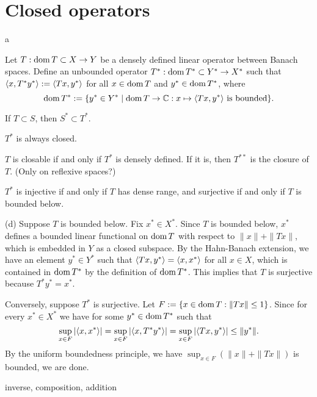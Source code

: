 \documentclass{../../large}
\begin{document}
\section{Closed operators}

\begin{prb}
\begin{parts}
\item a
\end{parts}
\end{prb}

\begin{prb}
Let $T:\operatorname{dom} T\subset X\to Y$ be a densely defined linear operator between Banach spaces.
Define an unbounded operator $T^*:\operatorname{dom} T^*\subset Y^*\to X^*$ such that $\langle x,T^*y^*\rangle:=\langle Tx,y^*\rangle$ for all $x\in\operatorname{dom} T$ and $y^*\in\operatorname{dom} T^*$, where
\[\operatorname{dom} T^*:=\{y^*\in Y^*\mid \operatorname{dom} T\to\mathbb{C}:x\mapsto\langle Tx,y^*\rangle\text{ is bounded}\}.\]
\begin{parts}
\item If $T\subset S$, then $S^*\subset T^*$.
\item $T^*$ is always closed.
\item $T$ is closable if and only if $T^*$ is densely defined. If it is, then $T^{**}$ is the closure of $T$. (Only on reflexive spaces?)
\item $T^*$ is injective if and only if $T$ has dense range, and surjective if and only if $T$ is bounded below.
\end{parts}
\end{prb}
\begin{pf}

(d)
Suppose $T$ is bounded below.
Fix $x^*\in X^*$.
Since $T$ is bounded below, $x^*$ defines a bounded linear functional on $\operatorname{dom} T$ with respect to $\|x\|+\|Tx\|$, which is embedded in $Y$ as a closed subspace.
By the Hahn-Banach extension, we have an element $y^*\in Y^*$ such that $\langle Tx,y^*\rangle=\langle x,x^*\rangle$ for all $x\in X$, which is contained in $\operatorname{dom} T^*$ by the definition of $\operatorname{dom} T^*$.
This implies that $T$ is surjective because $T^*y^*=x^*$.

Conversely, suppose $T^*$ is surjective.
Let $F:=\{x\in\operatorname{dom} T:\|Tx\|\le1\}$.
Since for every $x^*\in X^*$ we have for some $y^*\in\operatorname{dom} T^*$ such that
\[\sup_{x\in F}|\langle x,x^*\rangle|=\sup_{x\in F}|\langle x,T^*y^*\rangle|=\sup_{x\in F}|\langle Tx,y^*\rangle|\le\|y^*\|.\]
By the uniform boundedness principle, we have $\sup_{x\in F}(\|x\|+\|Tx\|)$ is bounded, we are done.
\end{pf}

\begin{prb}
inverse, composition, addition
\end{prb}
\end{document}
